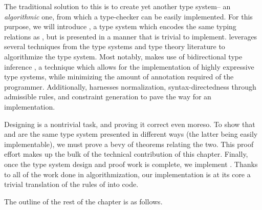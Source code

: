 The traditional solution to this is to create yet another type system-- an \textit{algorithmic} one, from which a type-checker can be easily implemented. For this purpose, we will introduce \bilambdaamor, a type system which encodes the same typing relations as \dlambdaamor, but is presented in a manner that is trivial to implement. \bilambdaamor leverages several techniques from the type systems and type theory literature to algorithmize the \dlambdaamor type system. Most notably, \bilambdaamor makes use of bidirectional type inference \cite{pierce-and-turner:lti}, a technique which allows for the implementation of highly expressive type systems, while minimizing the amount of annotation required of the programmer. Additionally, \bilambdaamor harnesses normalization, syntax-directedness through admissible rules, and constraint generation to pave the way for an implementation.

Designing \bilambdaamor is a nontrivial task, and proving it correct even moreso. To show that \dlambdaamor and \bilambdaamor are the same type system presented in different ways (the latter being easily implementable), we must prove a bevy of theorems relating the two. This proof effort makes up the bulk of the technical contribution of this chapter. Finally, once the type system design and proof work is complete, we implement \bilambdaamor. Thanks to all of the work done in algorithmization, our implementation is at its core a trivial translation of the rules of \bilambdaamor into code.

The outline of the rest of the chapter is as follows.

